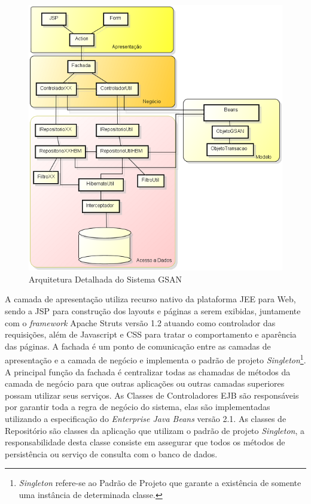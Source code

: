 \begin{figure}[H]
	\centering
	\caption{Arquitetura Detalhada do Sistema GSAN}	
	\label{figura:arquiteturaDetalhada}
	\includegraphics{figuras/gsanArquiteturaMenor.png}
\end{figure}

	
A camada de apresentação utiliza recurso nativo da plataforma JEE para Web, sendo a JSP para construção dos layouts e páginas a serem exibidas, juntamente com o \textit{framework} Apache Struts versão 1.2 atuando como controlador das requisições, além de Javascript e CSS para tratar o comportamento e aparência das páginas.
A fachada é um ponto de comunicação entre as camadas de apresentação e a camada de negócio e implementa o padrão de projeto \textit{Singleton}\footnote{\textit{Singleton} refere-se ao Padrão de Projeto que garante a existência de somente uma instância de determinada classe.}. 
A principal função da fachada é centralizar todas as chamadas de métodos da camada de negócio para que outras aplicações ou outras camadas superiores possam utilizar seus serviços.
As Classes de Controladores EJB são responsáveis por garantir toda a regra de negócio do sistema, elas são implementadas utilizando a especificação do \textit{Enterprise Java Beans} versão 2.1.
As classes de Repositório são classes da aplicação que utilizam o padrão de projeto \textit{Singleton}, a responsabilidade desta classe consiste em assegurar que todos os métodos de persistência ou serviço de consulta com o banco de dados.

